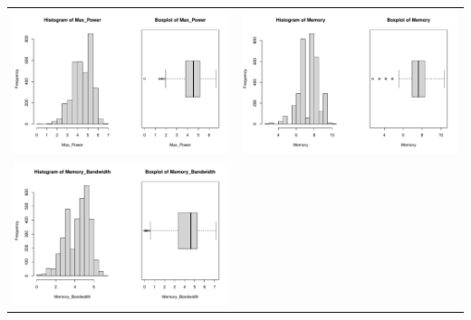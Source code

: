 \documentclass[a4paper]{article}
\theoremstyle{definition}
\begin{document}
\begin{center}
\begin{adjustbox}{width=\textwidth}
    \begin{tabular}{cc}
        \includegraphics[keepaspectratio, width=1\textwidth, height=1\textheight]{Visualization/Rplot_13.pdf}
        &\includegraphics[keepaspectratio, width=1\textwidth, height=1\textheight]{Visualization/Rplot_14.pdf}\\
        \includegraphics[keepaspectratio, width=1\textwidth, height=1\textheight]{Visualization/Rplot_15.pdf}

\end{tabular}
\end{adjustbox}
\end{center}
\end{document}
